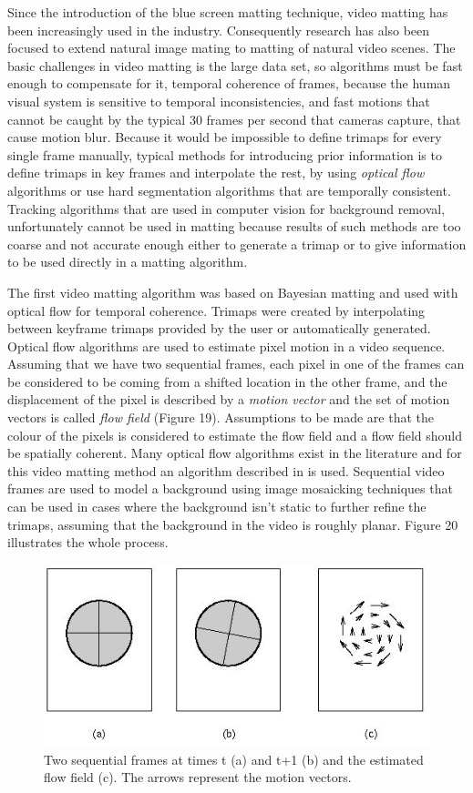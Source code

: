 Since the introduction of the blue screen matting technique, video matting has been increasingly used in the industry. Consequently research has also been focused to extend natural image mating to matting of natural video scenes. The basic challenges in video matting is the large data set, so algorithms must be fast enough to compensate for it, temporal coherence of frames, because the human visual system is sensitive to temporal inconsistencies, and fast motions that cannot be caught by the typical 30 frames per second that cameras capture, that cause motion blur. Because it would be impossible to define trimaps for every single frame manually, typical methods for introducing prior information is to define trimaps in key frames and interpolate the rest, by using \textit{optical flow} algorithms or use hard segmentation algorithms that are temporally consistent. Tracking algorithms that are used in computer vision for background removal, unfortunately cannot be used in matting because results of such methods are too coarse and not accurate enough either to generate a trimap or to give information to be used directly in a matting algorithm.
\par
The first video matting algorithm \cite{video} was based on Bayesian matting \cite{bayesian} and used with optical flow for temporal coherence. Trimaps were created by interpolating between keyframe trimaps provided by the user or automatically generated. Optical flow algorithms are used to estimate pixel motion in a video sequence. Assuming that we have two sequential frames, each pixel in one of the frames can be considered to be coming from a shifted location in the other frame, and the displacement of the pixel is described by a \textit{motion vector} and the set of motion vectors is called \textit{flow field} (Figure 19). Assumptions to be made are that the colour of the pixels is considered to estimate the flow field and a flow field should be spatially coherent. Many optical flow algorithms exist in the literature and for this video matting method an algorithm described in \cite{flow} is used. Sequential video frames are used to model a background using image mosaicking techniques \cite{mosaic} that can be used in cases where the background isn’t static to further refine the trimaps, assuming that the background in the video is roughly planar. Figure 20 illustrates the whole process.

\begin{figure}[t!]
\centering
\includegraphics[width=0.8\columnwidth]{Chapter2/2/optical_figure_1.jpg}
\caption[Motion vectors and flow field.]{Two sequential frames at times t (a) and t+1 (b) and the estimated flow field (c). The arrows represent the motion vectors. }
\label{fig:optical-f1}
\end{figure}

